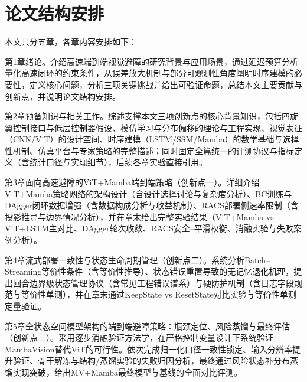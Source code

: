 \section{论文结构安排}

本文共分五章，各章内容安排如下：

第1章\quad 绪论。介绍高速端到端视觉避障的研究背景与应用场景，通过延迟预算分析量化高速闭环的约束条件，从误差放大机制与部分可观测性角度阐明时序建模的必要性，定义核心问题，分析三项关键挑战并给出可验证命题，总结本文主要贡献与创新点，并说明论文结构安排。

第2章\quad 预备知识与相关工作。综述支撑本文三项创新点的核心背景知识，包括四旋翼控制接口与低层控制器假设、模仿学习与分布偏移的理论与工程实现、视觉表征（CNN/ViT）的设计空间、时序建模（LSTM/SSM/Mamba）的数学基础与选择性机制、仿真平台与专家策略的完整描述；同时固定全篇统一的评测协议与指标定义（含统计口径与实现细节），后续各章实验直接引用。

第3章\quad 面向高速避障的ViT+Mamba端到端策略（创新点一）。详细介绍ViT+Mamba策略网络的架构设计（含设计选择讨论与复杂度分析）、BC训练与DAgger闭环数据增强（含数据构成分析与收益机制）、RACS部署侧速率限制（含投影推导与边界情况分析），并在章末给出完整实验结果（ViT+Mamba vs ViT+LSTM主对比、DAgger轮次收敛、RACS安全--平滑权衡、消融实验与失败案例分析）。

第4章\quad 流式部署一致性与状态生命周期管理（创新点二）。系统分析Batch--Streaming等价性条件（含等价性推导）、状态错误重置导致的无记忆退化机理，提出回合边界级状态管理协议（含常见工程错误谱系）与硬防护机制（含日志字段规范与等价性单测），并在章末通过KeepState vs ResetState对比实验与等价性单测定量验证。

第5章\quad 全状态空间模型架构的端到端避障策略：瓶颈定位、风险蒸馏与最终评估（创新点三）。采用逐步消融验证方法学，在严格控制变量设计下系统验证MambaVision替代ViT的可行性。依次完成归一化口径一致性锁定、输入分辨率提升验证、骨干解冻与结构/蒸馏实验的失败归因分析，最终通过风险状态补分布蒸馏实现突破，给出MV+Mamba最终模型与基线的全面对比评测。
